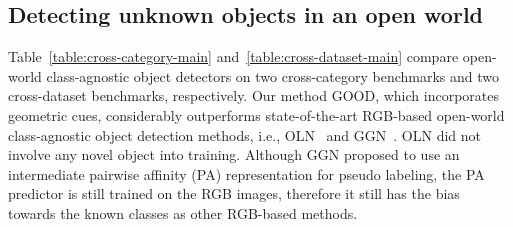 \documentclass{article} \usepackage{iclr2023_conference,times}
\begin{document}
\subsection{Detecting unknown objects in an open world}
Table~\ref{table:cross-category-main} and~\ref{table:cross-dataset-main} compare open-world class-agnostic object detectors on two cross-category benchmarks and two cross-dataset benchmarks, respectively. Our method GOOD, which incorporates geometric cues, considerably outperforms state-of-the-art RGB-based open-world class-agnostic object detection methods, i.e., OLN~\citep{kim_learning_2021} and GGN~\citep{wang2022open}. OLN did not involve any novel object into training. Although GGN proposed to use an intermediate pairwise affinity (PA) representation for pseudo labeling, the PA predictor is still trained on the RGB images, therefore it still has the bias towards the known classes as other RGB-based methods. 
\end{document}
